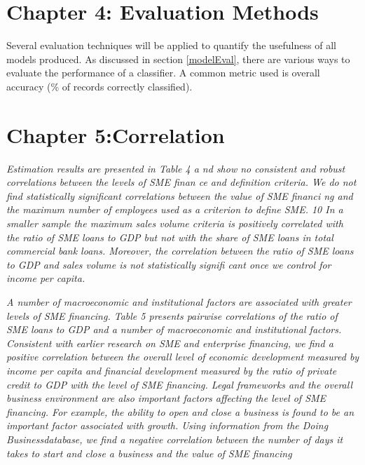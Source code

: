 \section{Chapter 4: Evaluation Methods}
Several evaluation techniques will be applied to quantify the usefulness of all models produced. As discussed in section \ref{modelEval}, there are various ways to evaluate the performance of a classifier. A common metric used is overall accuracy (\% of records correctly classified). 

\section{Chapter 5:Correlation}
\textit{Estimation results are presented in Table 4 a
	nd show no consistent 
	and robust correlations 
	between the levels of SME finan
	ce and definition criteria. We do not find statistically significant 
	correlations between the value of SME financi
	ng and the maximum number of employees used 
	as a criterion to define SME.
	10
	In a smaller sample the maximum sales volume criteria is 
	positively correlated with the ratio of SME loans to GDP but not with the share of SME loans in 
	total commercial bank loans.  Moreover, the correlation between the ratio of SME loans to GDP 
	and sales volume is not statistically signifi
	cant once we control for income per capita.   }
	
	\textit{A number of macroeconomic and institutional factors are associated with greater levels of SME financing.  Table 5 presents pairwise correlations of the ratio of SME loans to GDP and a number of macroeconomic and institutional factors. Consistent with earlier research on SME and enterprise financing, we find a positive correlation between the overall level of economic development measured by income per capita and financial development measured by the ratio of private credit to GDP with the level of SME financing.  Legal frameworks and the overall business environment are also important factors affecting the level of SME financing.  For example, the ability to open and close a business is found to be an important factor associated with growth.  Using information from the Doing Businessdatabase, we find a negative correlation between the number of days it takes to start and close a business and the value of SME financing}
	
